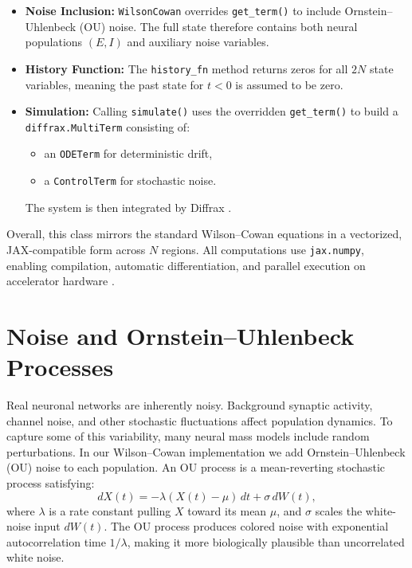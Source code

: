 \documentclass[11pt,a4paper]{article}
\begin{document}
\begin{itemize}
\item \textbf{Noise Inclusion:}
\texttt{WilsonCowan} overrides \texttt{get\_term()} to include
Ornstein--Uhlenbeck (OU) noise.
The full state therefore contains both neural populations $(E, I)$ and
auxiliary noise variables.

\item \textbf{History Function:}
The \texttt{history\_fn} method returns zeros for all $2N$ state variables,
meaning the past state for $t < 0$ is assumed to be zero.

\item \textbf{Simulation:}
Calling \texttt{simulate()} uses the overridden \texttt{get\_term()} to build a
\texttt{diffrax.MultiTerm} consisting of:
\begin{itemize}
\item an \texttt{ODETerm} for deterministic drift,
\item a \texttt{ControlTerm} for stochastic noise.
\end{itemize}
The system is then integrated by Diffrax \cite{kidger2021neural}.

\end{itemize}


Overall, this class mirrors the standard Wilson--Cowan equations in a
vectorized, JAX-compatible form across $N$ regions.  
All computations use \texttt{jax.numpy}, enabling compilation, automatic
differentiation, and parallel execution on accelerator hardware \cite{kidger2021equinox}.


\section{Noise and Ornstein--Uhlenbeck Processes}
Real neuronal networks are inherently noisy. Background synaptic activity, channel noise, and other
stochastic fluctuations affect population dynamics. To capture some of this variability, many neural mass
models include random perturbations. In our Wilson--Cowan implementation we add Ornstein--Uhlenbeck
(OU) noise to each population. An OU process is a mean-reverting stochastic process satisfying:
\begin{equation}
dX(t) = -\lambda (X(t) - \mu)\, dt + \sigma\, dW(t),
\end{equation}
where $\lambda$ is a rate constant pulling $X$ toward its mean $\mu$, and $\sigma$ scales the white-
noise input $dW(t)$. The OU process produces colored noise with exponential autocorrelation time
$1/\lambda$, making it more biologically plausible than uncorrelated white noise.
\end{document}
